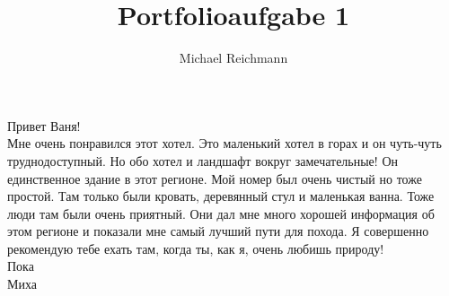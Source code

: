 \documentclass[a4paper]{article}
\title{Portfolioaufgabe 1}
\author{Michael Reichmann}
\begin{document}
\vspace*{1ex}

%
Привет Ваня!\\[1ex]
Мне очень понравился этот хотел. Это маленький хотел в горах и он чуть-чуть труднодоступный. Но обо хотел и ландшафт вокруг замечательные! Он единственное здание в этот регионе. Мой номер был очень чистый но тоже простой. Там только были кровать, деревянный стул и маленькая ванна. Тоже люди там были очень приятный. Они дал мне много хорошей информация об этом регионе и показали мне самый лучший пути для похода. Я совершенно рекомендую тебе ехать там, когда ты, как я, очень любишь природу!\\[1ex]
Пока\\
\hspace*{1ex} Миха
\end{document}
